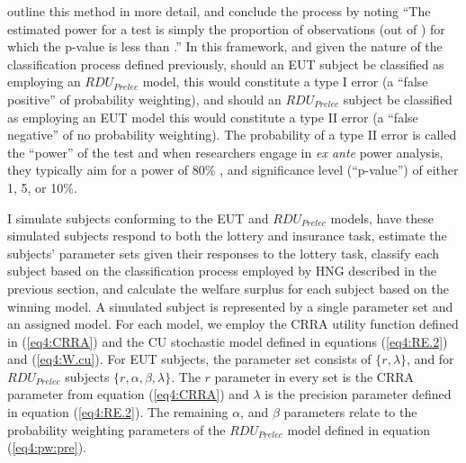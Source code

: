 \documentclass[../main.tex]{subfiles}
\begin{document}
\textcite[109]{Feiveson2002} outline this method in more detail, and conclude the process by noting \enquote{The estimated power for a  test is simply the proportion of observations (out of ) for which the p-value is less than .}
In this framework, and given the nature of the classification process defined previously, should an EUT subject be classified as employing an $\mathit{RDU_{Prelec}}$ model, this would constitute a type I error (a \enquote{false positive} of probability weighting), and should an $\mathit{RDU_{Prelec}}$ subject be classified as employing an EUT model this would constitute a type II error (a \enquote{false negative} of no probability weighting).
The probability of a type II error is called the \enquote{power} of the test and when researchers engage in \textit{ex ante} power analysis, they typically aim for a power of 80\% \parencite{Cohen1988, Gelman2014}, and significance level (\enquote{p-value}) of either 1, 5, or 10\%.

I simulate subjects conforming to the EUT and $\mathit{RDU_{Prelec}}$ models, have these simulated subjects respond to both the lottery and insurance task, estimate the subjects' parameter sets given their responses to the lottery task, classify each subject based on the classification process employed by HNG described in the previous section, and calculate the welfare surplus for each subject based on the winning model.{\footnotemark}
A simulated subject is represented by a single parameter set and an assigned model.
For each model, we employ the CRRA utility function defined in (\ref{eq4:CRRA}) and the CU stochastic model defined in equations (\ref{eq4:RE.2}) and (\ref{eq4:W.cu}).
For EUT subjects, the parameter set consists of $\lbrace r, \lambda \rbrace$, and for $\mathit{RDU_{Prelec}}$ subjects $\lbrace r, \alpha, \beta, \lambda \rbrace$.
The $r$ parameter in every set is the CRRA parameter from equation (\ref{eq4:CRRA}) and $\lambda$ is the precision parameter defined in equation (\ref{eq4:RE.2}).
The remaining $\alpha$, and $\beta$ parameters relate to the probability weighting parameters of the $\mathit{RDU_{Prelec}}$ model defined in equation (\ref{eq4:pw:pre}).

\addtocounter{footnote}{-1}
\end{document}
